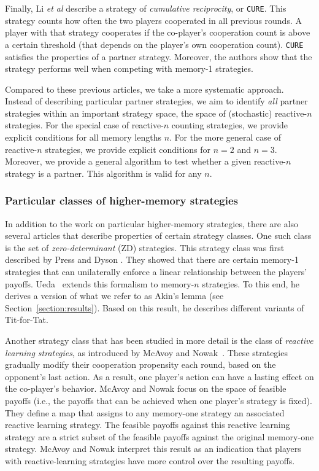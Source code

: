 \documentclass[9pt,twoside,lineno]{pnas-new}
\theoremstyle{plainCl1}
\theoremstyle{plainCl2}
\def\cure{\texttt{CURE}}
\begin{document}
Finally, Li {\it et al} \cite{li:NatureCompSci:2022} describe a strategy of {\it cumulative reciprocity}, or \cure. 
This strategy counts how often the two players cooperated in all previous rounds. 
A player with that strategy cooperates if the co-player's cooperation count is above a certain threshold (that depends on the player's own cooperation count). 
\cure{} satisfies the properties of a partner strategy. 
Moreover, the authors show that the strategy performs well when competing with memory-1 strategies. 

Compared to these previous articles, we take a more systematic approach. 
Instead of describing particular partner strategies, we aim to identify {\it all} partner strategies within an important strategy space, the space of (stochastic) reactive-$n$ strategies. 
For the special case of reactive-$n$ counting strategies, we provide explicit conditions for all memory lengths $n$. 
For the more general case of reactive-$n$ strategies, we provide explicit conditions for $n\!=\!2$ and $n\!=\!3$. 
Moreover, we provide a general algorithm to test whether a given reactive-$n$ strategy is a partner. 
This algorithm is valid for any $n$. 

\subsubsection*{Particular classes of higher-memory strategies}
In addition to the work on particular higher-memory strategies, there are also several articles that describe properties of certain strategy classes. One such class is the set of {\it zero-determinant} (ZD) strategies. 
This strategy class was first described by Press and Dyson \cite{press:PNAS:2012}. 
They showed that there are certain memory-1 strategies that can unilaterally enforce a linear relationship between the players' payoffs. 
Ueda~\cite{ueda:RSOP:2021, Ueda:ORF:2022} extends this formalism to memory-$n$ strategies. 
To this end, he derives a version of what we refer to as Akin's lemma (see Section~\ref{section:results}). 
Based on this result, he describes different variants of Tit-for-Tat. 

Another strategy class that has been studied in more detail is the class of {\it reactive learning strategies}, as introduced by McAvoy and Nowak~\cite{mcavoy:PRSA:2019}.
These strategies gradually modify their cooperation propensity each round, based on the opponent's last action. 
As a result, one player's action can have a lasting effect on the co-player's behavior. 
McAvoy and Nowak focus on the space of feasible payoffs (i.e., the payoffs that can be achieved when one player's strategy is fixed). 
They define a map that assigns to any memory-one strategy an associated reactive learning strategy. 
The feasible payoffs against this reactive learning strategy are a strict subset of the feasible payoffs against the original memory-one strategy. 
McAvoy and Nowak interpret this result as an indication that players with reactive-learning strategies have more control over the resulting payoffs. 
\end{document}
